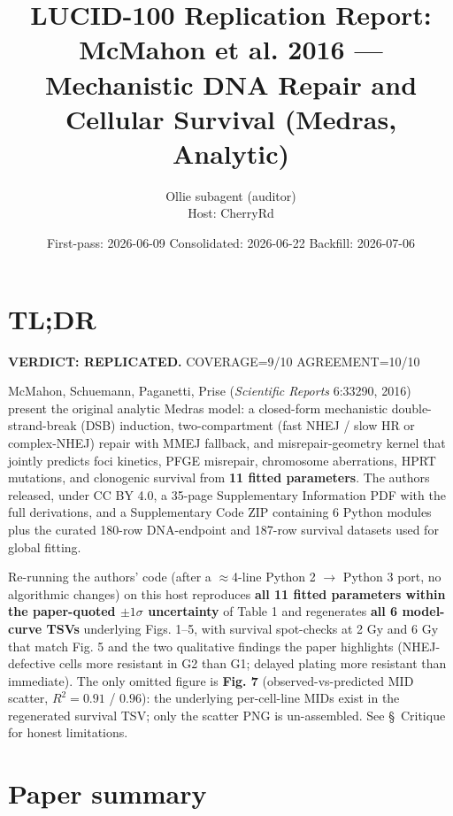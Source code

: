 \documentclass[11pt]{article}
\title{LUCID-100 Replication Report: \\
McMahon et al. 2016 --- Mechanistic DNA Repair and Cellular Survival (Medras, Analytic)}
\author{Ollie subagent (auditor) \\ Host: CherryRd}
\date{First-pass: 2026-06-09 \quad Consolidated: 2026-06-22 \quad Backfill: 2026-07-06}
\begin{document}
\maketitle

\section*{TL;DR}

\textbf{VERDICT: REPLICATED.} \quad COVERAGE=9/10 \quad AGREEMENT=10/10

McMahon, Schuemann, Paganetti, Prise (\emph{Scientific Reports} 6:33290, 2016)
present the original analytic Medras model: a closed-form mechanistic
double-strand-break (DSB) induction, two-compartment (fast NHEJ / slow HR
or complex-NHEJ) repair with MMEJ fallback, and misrepair-geometry kernel
that jointly predicts foci kinetics, PFGE misrepair, chromosome
aberrations, HPRT mutations, and clonogenic survival from
\textbf{11 fitted parameters}. The authors released, under CC BY 4.0, a
35-page Supplementary Information PDF with the full derivations, and a
Supplementary Code ZIP containing 6 Python modules plus the curated
180-row DNA-endpoint and 187-row survival datasets used for global
fitting.

Re-running the authors' code (after a $\approx$4-line Python 2 $\rightarrow$ Python 3
port, no algorithmic changes) on this host reproduces \textbf{all 11
fitted parameters within the paper-quoted $\pm 1\sigma$ uncertainty} of
Table 1 and regenerates \textbf{all 6 model-curve TSVs} underlying Figs.
1--5, with survival spot-checks at 2 Gy and 6 Gy that match Fig. 5 and
the two qualitative findings the paper highlights (NHEJ-defective cells
more resistant in G2 than G1; delayed plating more resistant than
immediate). The only omitted figure is \textbf{Fig. 7} (observed-vs-predicted
MID scatter, $R^2 = 0.91$ / $0.96$): the underlying per-cell-line MIDs
exist in the regenerated survival TSV; only the scatter PNG is
un-assembled. See \S~Critique for honest limitations.

\section{Paper summary}
\end{document}
